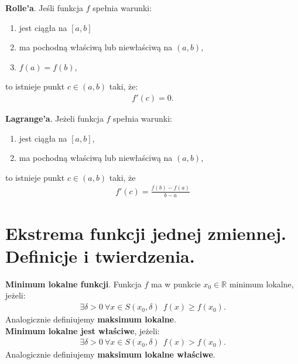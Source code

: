 \documentclass[12pt]{article}
\begin{document}
    \begin{theorem}
        \textbf{Rolle'a}. Jeśli funkcja $f$ spełnia warunki:
        \begin{enumerate}
            \item jest ciągła na $[a,b]$
            \item ma pochodną właściwą lub niewłaściwą na $(a,b)$,
            \item $f(a) = f(b)$,
        \end{enumerate}
        to istnieje punkt $c \in (a,b)$ taki, że:
        \begin{align*}
            f'(c) = 0.
        \end{align*}
    \end{theorem}

    \begin{theorem}
        \textbf{Lagrange'a}. Jeżeli funkcja $f$ spełnia warunki:
        \begin{enumerate}
            \item jest ciągła na $[a,b]$,
            \item ma pochodną właściwą lub niewłaściwą na $(a,b)$,
        \end{enumerate}
        to istnieje punkt $c \in (a,b)$ taki, że
        \begin{align*}
            f'(c) = \frac{f(b)-f(a)}{b-a}
        \end{align*}
    \end{theorem}

    \newpage

    \section{Ekstrema funkcji jednej zmiennej. Definicje i twierdzenia.}

    \begin{definition}
        \textbf{Minimum lokalne funkcji}. Funkcja $f$ ma w punkcie $x_0 \in \mathbb{R}$ minimum lokalne, jeżeli:
        \begin{align*}
            \exists \delta > 0 ~ \forall x \in S(x_0, \delta) ~~ f(x) \geq f(x_0).
        \end{align*}
        Analogicznie definiujemy \textbf{maksimum lokalne}.\\

        \textbf{Minimum lokalne jest właściwe}, jeżeli:
        \begin{align*}
            \exists \delta > 0 ~ \forall x \in S(x_0, \delta) ~~ f(x) > f(x_0).
        \end{align*}
        Analogicznie definiujemy \textbf{maksimum lokalne właściwe}.\\
    \end{definition}
\end{document}
